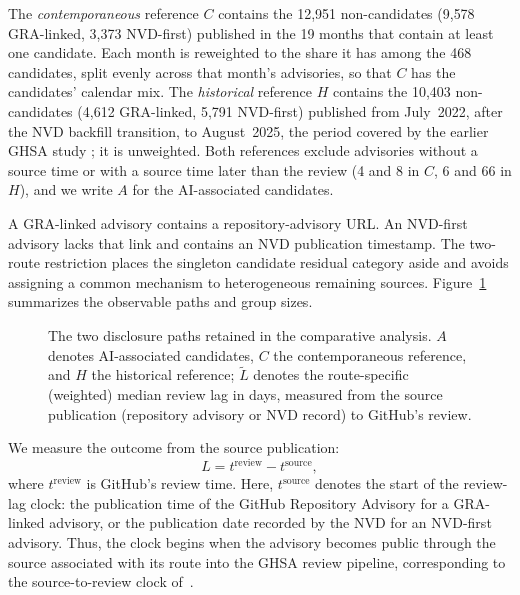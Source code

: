 \documentclass[smallextended,natbib]{svjour3}
\begin{document}
The \emph{contemporaneous} reference $C$ contains the 12{,}951 non-candidates
(9{,}578 GRA-linked, 3{,}373 NVD-first) published in the 19 months that
contain at least one candidate.  Each month is reweighted to the share it has
among the 468 candidates, split evenly across that month's advisories, so
that $C$ has the candidates' calendar mix.  The \emph{historical} reference $H$
contains the 10{,}403 non-candidates (4{,}612 GRA-linked, 5{,}791 NVD-first)
published from July~2022, after the NVD backfill transition, to
August~2025, the period covered by the earlier GHSA study
\citep{segal2026ghsa}; it is unweighted.  Both references exclude advisories
without a source time or with a source time later than the review (4 and 8 in
$C$, 6 and 66 in $H$), and we write $A$ for the AI-associated candidates.

A GRA-linked advisory contains a repository-advisory URL.  An NVD-first
advisory lacks that link and contains an NVD publication timestamp.  The
two-route restriction places the singleton candidate residual category aside
and avoids assigning a common mechanism to heterogeneous remaining sources.
Figure~\ref{fig:paths} summarizes the observable paths and group sizes.

\begin{figure}[t]
\centering
\resizebox{0.97\textwidth}{!}{}
\caption{The two disclosure paths retained in the comparative analysis.
$A$ denotes AI-associated candidates, $C$ the contemporaneous reference, and
$H$ the historical reference; $\widetilde L$ denotes the route-specific
(weighted) median review lag in days, measured from the source publication
(repository advisory or NVD record) to GitHub's review. } %
\label{fig:paths}
\end{figure}

We measure the outcome from the source publication:
\begin{equation}
L=t^{\mathrm{review}}-t^{\mathrm{source}},
\label{eq:harmonized-lag}
\end{equation}
where $t^{\mathrm{review}}$ is GitHub's review time.  
Here, $t^{\mathrm{source}}$ denotes the start of the review-lag clock: the
publication time of the GitHub Repository Advisory for a GRA-linked advisory,
or the publication date recorded by the NVD for an NVD-first advisory. Thus,
the clock begins when the advisory becomes public through the source associated
with its route into the GHSA review pipeline, corresponding to the source-to-review
clock of~\cite{segal2026ghsa}.
\end{document}
